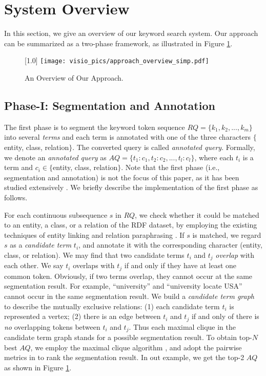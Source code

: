 \section{System Overview} \label{sec:overview}

In this section, we give an overview of our keyword search system. Our approach can be summarized as a two-phase framework, as illustrated in Figure \ref{fig:overview}. 

\begin{figure} [h]
	\centering
	\scalebox{1.0}[1.0]
	{
		\resizebox{\linewidth}{!}
		{
			\texttt{[image: visio\_pics/approach\_overview\_simp.pdf]}
		}
	}
	\vspace{-0.3in}
	\caption{An Overview of Our Approach.}
	\label{fig:overview}
	\vspace{-0.2in}
\end{figure}

\subsection{Phase-I: Segmentation and Annotation} \label{sec:phase1}
The first phase is to segment the keyword token sequence $RQ = \{k_1, k_2, ..., k_m\}$ into several \emph{terms} and each term is annotated with one of the three characters $\{$entity, class, relation$\}$. The converted query is called \emph{annotated query}. Formally, we denote an \textit{annotated query} as $AQ= \{t_1:c_1, t_2:c_2, ..., t_l:c_l\}$, where each $t_i$ is a term and  $c_i \in \{$entity, class, relation$\}$. Note that the first phase (i.e., segmentation and annotation) is not the focus of this paper, as it has been studied extensively \cite{hua2015short,han2011generative, li2011faerie, nakashole2012patty,cai2013large}. We briefly describe the implementation of the first phase as follows. 

For each continuous subsequence $s$ in $RQ$, we check whether it could be matched to an entity, a class, or a relation of the RDF dataset, by employing the existing techniques of entity linking \cite{han2011generative,li2011faerie, ratinov2011local} and relation paraphrasing \cite{nakashole2012patty,cai2013large}. If $s$ is matched, we regard $s$ as a \emph{candidate term} $t_i$, and annotate it with the corresponding character (entity, class, or relation).
We may find that two candidate terms $t_i$ and $t_j$ \emph{overlap} with each other. We say $t_i$ overlaps with $t_j$ if and only if they have at least one common token. Obviously, if two terms overlap, they cannot occur at the same segmentation result. For example, ``university'' and ``university locate USA'' cannot occur in the same segmentation result. We build a \emph{candidate term graph} to describe the mutually exclusive relations: (1) each candidate term $t_i$ is represented a vertex; (2) there is an edge between $t_i$ and $t_j$ if and only of there is \emph{no} overlapping tokens between $t_i$ and $t_j$. Thus each maximal clique in the candidate term graph stands for a possible segmentation result. To obtain top-$N$ best $AQ$, we employ the maximal clique algorithm \cite{bron1973algorithm}, and adopt the pairwise metrics in \cite{hua2015short} to rank the segmentation result.
In out example, we get the top-2 $AQ$ as shown in Figure \ref{fig:overview}.

